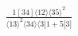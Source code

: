 \documentclass[varwidth, border=5pt]{standalone}
\begin{document}
\begin{my}
$\begin{gathered}
\scriptscriptstyle\frac{1[34]⟨12⟩⟨35⟩^2}{⟨13⟩^2⟨34⟩⟨3|1+5|3]}
\end{gathered}$
\end{my}
\end{document}
